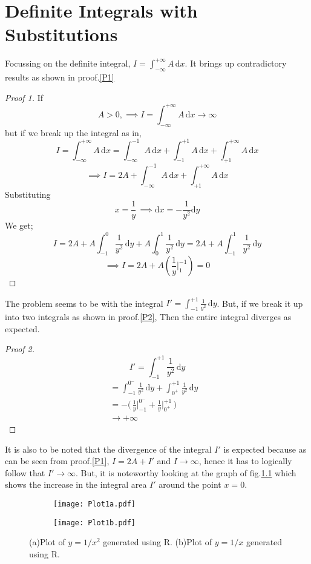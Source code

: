 \chapter{Definite Integrals with Substitutions}
\label{chap:1}
Focussing on the definite integral, $I =\int_{-\infty}^{+\infty}A\,\mathrm{d}x$. It brings up contradictory results as shown in proof.\ref{P1}
\begin{proof}[Proof 1]\label{P1}
	If $$A > 0, \implies I = \int_{-\infty}^{+\infty}A\,\mathrm{d}x \to \infty$$
	but if we break up the integral as in,
	$$I = \int_{-\infty}^{+\infty}A\,\mathrm{d}x = \int_{-\infty}^{-1}A\,\mathrm{d}x + \int_{-1}^{+1}A\,\mathrm{d}x + \int_{+1}^{+\infty}A\,\mathrm{d}x$$
	$$\implies I = 2A + \int_{-\infty}^{-1}A\,\mathrm{d}x + \int_{+1}^{+\infty}A\,\mathrm{d}x$$
	Substituting $$x = \frac{1}{y}\, \implies \mathrm{d}x = -\frac{1}{y^2} \mathrm{d}y$$
	We get;
	$$I = 2A +A\int_{-1}^{0} \frac{1}{y^2}\,\mathrm{d}y +A\int_{0}^{1} \frac{1}{y^2}\,\mathrm{d}y = 2A + A\int_{-1}^{1}\frac{1}{y^2}\,\mathrm{d}y$$
	$$\implies I = 2A + A(\frac{1}{y}\bigg\rvert_{1}^{-1}) = 0 $$
\end{proof}
The problem seems to be with the integral $I' = \int_{-1}^{+1}\frac{1}{y^2}\,\mathrm{d}y$. But, if we break it up into two integrals as shown in proof.\ref{P2}, Then the entire integral diverges as expected.
\begin{proof}[Proof 2]\label{P2}
	$$I' = \int_{-1}^{+1}\frac{1}{y^2}\,\mathrm{d}y$$
	\begin{align*}
		& = \int_{-1}^{0^-}\frac{1}{y^2}\,\mathrm{d}y + \int_{0^+}^{+1}\frac{1}{y^2}\,\mathrm{d}y \\
		& = -\bigg(\, \frac{1}{y}\bigg\rvert_{-1}^{0^-} + \frac{1}{y}\bigg\rvert_{0^+}^{+1}\,\bigg)\\
		& \to +\infty &&
	\end{align*}
\end{proof}
It is also to be noted that the divergence of the integral $I'$ is expected because as can be seen from proof.\ref{P1}, $I = 2A + I'$ and $I \to \infty$, hence it has to logically follow that $I' \to \infty$. But, it is noteworthy looking at the graph of fig.\ref{F1a} which shows the increase in the integral area $I'$ around the point $x=0$.
\begin{figure}[h]
	\centering
	\begin{subfigure}[t]{0.49\textwidth}
		\centering
		\texttt{[image: Plot1a.pdf]}
		\label{F1a}
	\end{subfigure}
	\hfill
	\begin{subfigure}[t]{0.49\textwidth}
		\centering
		\texttt{[image: Plot1b.pdf]}
		\label{F1b}
	\end{subfigure}
	\caption{(a)Plot of $y=1/x^2$ generated using R. (b)Plot of $y = 1/x$ generated using R.}\label{F1}
\end{figure}
